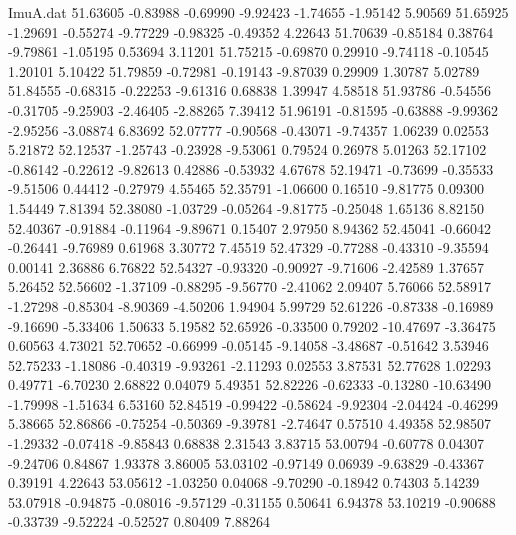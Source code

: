 \begin{filecontents}{ImuA.dat}
  51.63605   -0.83988   -0.69990   -9.92423   -1.74655   -1.95142    5.90569
  51.65925   -1.29691   -0.55274   -9.77229   -0.98325   -0.49352    4.22643
  51.70639   -0.85184    0.38764   -9.79861   -1.05195    0.53694    3.11201
  51.75215   -0.69870    0.29910   -9.74118   -0.10545    1.20101    5.10422
  51.79859   -0.72981   -0.19143   -9.87039    0.29909    1.30787    5.02789
  51.84555   -0.68315   -0.22253   -9.61316    0.68838    1.39947    4.58518
  51.93786   -0.54556   -0.31705   -9.25903   -2.46405   -2.88265    7.39412
  51.96191   -0.81595   -0.63888   -9.99362   -2.95256   -3.08874    6.83692
  52.07777   -0.90568   -0.43071   -9.74357    1.06239    0.02553    5.21872
  52.12537   -1.25743   -0.23928   -9.53061    0.79524    0.26978    5.01263
  52.17102   -0.86142   -0.22612   -9.82613    0.42886   -0.53932    4.67678
  52.19471   -0.73699   -0.35533   -9.51506    0.44412   -0.27979    4.55465
  52.35791   -1.06600    0.16510   -9.81775    0.09300    1.54449    7.81394
  52.38080   -1.03729   -0.05264   -9.81775   -0.25048    1.65136    8.82150
  52.40367   -0.91884   -0.11964   -9.89671    0.15407    2.97950    8.94362
  52.45041   -0.66042   -0.26441   -9.76989    0.61968    3.30772    7.45519
  52.47329   -0.77288   -0.43310   -9.35594    0.00141    2.36886    6.76822
  52.54327   -0.93320   -0.90927   -9.71606   -2.42589    1.37657    5.26452
  52.56602   -1.37109   -0.88295   -9.56770   -2.41062    2.09407    5.76066
  52.58917   -1.27298   -0.85304   -8.90369   -4.50206    1.94904    5.99729
  52.61226   -0.87338   -0.16989   -9.16690   -5.33406    1.50633    5.19582
  52.65926   -0.33500    0.79202  -10.47697   -3.36475    0.60563    4.73021
  52.70652   -0.66999   -0.05145   -9.14058   -3.48687   -0.51642    3.53946
  52.75233   -1.18086   -0.40319   -9.93261   -2.11293    0.02553    3.87531
  52.77628    1.02293    0.49771   -6.70230    2.68822    0.04079    5.49351
  52.82226   -0.62333   -0.13280  -10.63490   -1.79998   -1.51634    6.53160
  52.84519   -0.99422   -0.58624   -9.92304   -2.04424   -0.46299    5.38665
  52.86866   -0.75254   -0.50369   -9.39781   -2.74647    0.57510    4.49358
  52.98507   -1.29332   -0.07418   -9.85843    0.68838    2.31543    3.83715
  53.00794   -0.60778    0.04307   -9.24706    0.84867    1.93378    3.86005
  53.03102   -0.97149    0.06939   -9.63829   -0.43367    0.39191    4.22643
  53.05612   -1.03250    0.04068   -9.70290   -0.18942    0.74303    5.14239
  53.07918   -0.94875   -0.08016   -9.57129   -0.31155    0.50641    6.94378
  53.10219   -0.90688   -0.33739   -9.52224   -0.52527    0.80409    7.88264

\end{filecontents}
